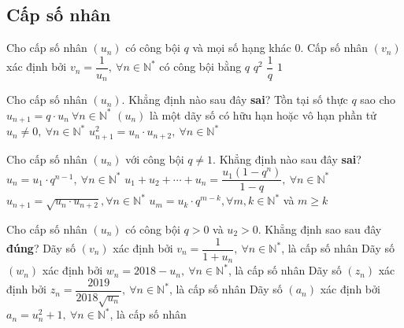 \subsection{Cấp số nhân}
\begin{ex}%
	Cho cấp số nhân $\left (u_n\right )$ có công bội $q$ và mọi số hạng khác $0$. Cấp số nhân  $\left (v_n \right )$ xác định bởi $v_n = \dfrac{1}{u_n},~ \forall n \in \mathbb{N}^*$  có công bội bằng
	\choice
	{$q$}
	{$q^2$}
	{\True $\dfrac{1}{q}$}
	{$1$}
\end{ex}

\begin{ex}%
	Cho cấp số nhân $\left (u_n\right )$. Khẳng định nào sau đây \textbf{sai}?
	\choice
	{Tồn tại số thực $q$ sao cho $u_{n+1} = q \cdot u_n ~ \forall n \in \mathbb{N}^*$}
	{$\left (u_n\right )$ là một dãy số có hữu hạn hoặc vô hạn phần tử}
	{\True $u_n \neq 0,~ \forall n \in \mathbb{N}^*$}
	{$u_{n+1}^2= u_n \cdot u_{n+2},~ \forall n \in \mathbb{N}^*$}
\end{ex}

\begin{ex}%
	Cho cấp số nhân $\left (u_n\right )$ với công bội $q \neq 1$. Khẳng định nào sau đây \textbf{sai}?
	\choice
	{$u_n = u_1 \cdot q^{n-1} ,~\forall n \in \mathbb{N^*}$}
	{$u_1 + u_2 + \cdots + u_n = \dfrac{u_1 \left (1-q^n\right )}{1-q} ,~\forall n \in \mathbb{N^*}$}
	{\True $u_{n+1} = \sqrt{u_n \cdot u_{n+2}}, \forall n \in \mathbb{N^*}$}
	{$u_m = u_k \cdot  q^{m-k}, \forall m,k \in \mathbb{N^*}$ và $m \geq k$}
\end{ex}


\begin{ex}%
	Cho cấp số nhân $\left (u_n\right )$ có công bội $q>0$ và $u_2 >0$. Khẳng định sao sau đây \textbf{đúng}?
	\choice
	{Dãy số $\left (v_n \right )$ xác định bởi $v_n = \dfrac{1}{1+u_n},~ \forall n \in \mathbb{N}^*$,  là cấp số nhân}
	{Dãy số $\left (w_n \right )$ xác định bởi $w_n = 2018-u_n,~ \forall n \in \mathbb{N}^*$,  là cấp số nhân}
	{\True Dãy số $\left (z_n \right )$ xác định bởi $z_n = \dfrac{2019}{2018\sqrt{u_n}},~ \forall n \in \mathbb{N}^*$,  là cấp số nhân}
	{Dãy số $\left (a_n \right )$ xác định bởi $a_n = u_n^2+1,~ \forall n \in \mathbb{N}^*$,  là cấp số nhân}
\end{ex}


